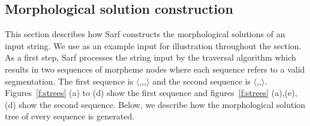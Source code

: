 \subsection{Morphological solution construction}
\label{ss:solconstr}


This section describes how Sarf  constructs the morphological solutions of an input string. We use  as an example input for illustration throughout the section.
As a first step, Sarf processes the string input by the traversal algorithm which results in two sequences of morpheme nodes where each sequence 
refers to a valid segmentation. The first sequence is $\langle$,,,$\rangle$ and 
the second sequence is $\langle$,,$\rangle$. 
Figures~\ref{f:strees} (a) to (d) show the first sequence and figures~\ref{f:strees} (a),(e),(d) show the second sequence. Below, we describe how the morphological solution tree of every sequence is generated.

